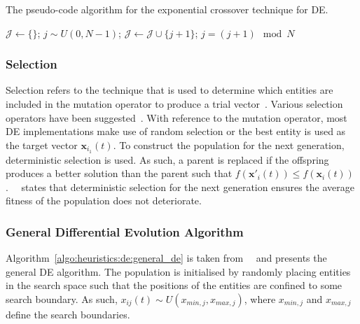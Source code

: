 \begin{algorithm}[htb]
	\caption{The pseudo-code algorithm for the exponential crossover technique for \acs{DE}.}
	\label{algo:heuristics:de:exp}
	\begin{algorithmic}
		\State $\mathcal{J} \gets \{\}$;
		\State $j \sim U(0,N - 1)$;
		\Repeat
		\State $\mathcal{J} \gets \mathcal{J} \cup \{j + 1 \}$;
		\State $j = (j+1) \mod N$
	\end{algorithmic}
\end{algorithm}

\subsubsection{Selection}\label{sec:heuristics:mh:de:selection}

Selection refers to the technique that is used to determine which entities are included in the mutation operator to produce a trial vector~\cite{ref:engelbrecht:2007}. Various selection operators have been suggested~\cite{ref:storn:1996, ref:storn:1997}. With reference to the mutation operator, most \acs{DE} implementations make use of random selection or the best entity is used as the target vector $\boldsymbol{x}_{i_{1}}(t)$. To construct the population for the next generation, deterministic selection is used. As such, a parent is replaced if the offspring produces a better solution than the parent such that $f(\boldsymbol{x}'_{i}(t)) \leq f(\boldsymbol{x}_{i}(t))$.~\citeauthor{ref:engelbrecht:2007}~\cite{ref:engelbrecht:2007} states that deterministic selection for the next generation ensures the average fitness of the population does not deteriorate.


\subsubsection{General Differential Evolution Algorithm}

Algorithm~\ref{algo:heuristics:de:general_de} is taken from~\citeauthor{ref:engelbrecht:2007}~\cite{ref:engelbrecht:2007} and presents the general \acs{DE} algorithm. The population is initialised by randomly placing entities in the search space such that the positions of the entities are confined to some search boundary. As such, $x_{ij}(t) \sim U(x_{min,j}, x_{max,j})$, where $x_{min,j}$ and $x_{max,j}$ define the search boundaries.

